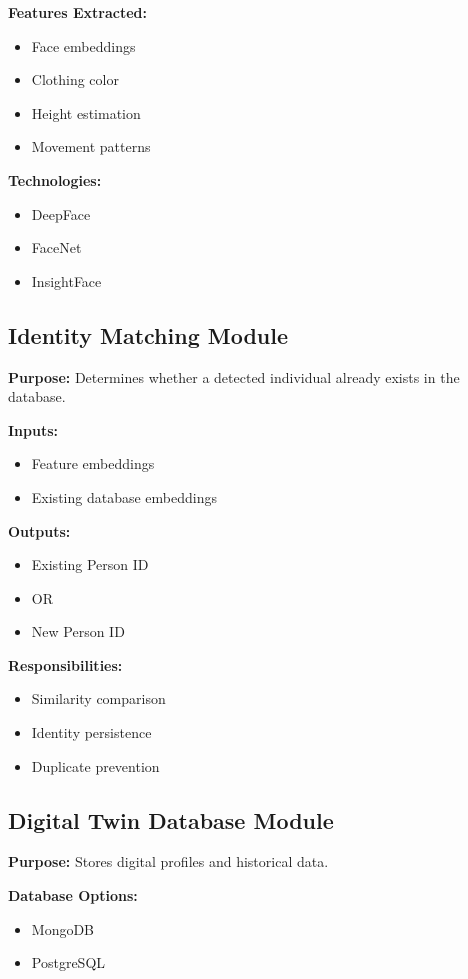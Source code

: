 \documentclass[12pt,a4paper]{article}
\begin{document}
\textbf{Features Extracted:}
\begin{itemize}
    \item Face embeddings
    \item Clothing color
    \item Height estimation
    \item Movement patterns
\end{itemize}

\textbf{Technologies:}
\begin{itemize}
    \item DeepFace
    \item FaceNet
    \item InsightFace
\end{itemize}

\subsection{Identity Matching Module}

\textbf{Purpose:}
Determines whether a detected individual already exists in the database.

\textbf{Inputs:}
\begin{itemize}
    \item Feature embeddings
    \item Existing database embeddings
\end{itemize}

\textbf{Outputs:}
\begin{itemize}
    \item Existing Person ID
    \item OR
    \item New Person ID
\end{itemize}

\textbf{Responsibilities:}
\begin{itemize}
    \item Similarity comparison
    \item Identity persistence
    \item Duplicate prevention
\end{itemize}

\subsection{Digital Twin Database Module}

\textbf{Purpose:}
Stores digital profiles and historical data.

\textbf{Database Options:}
\begin{itemize}
    \item MongoDB
    \item PostgreSQL
\end{itemize}
\end{document}
